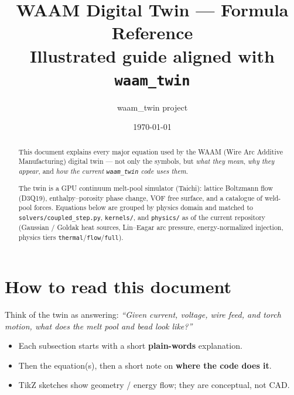 \documentclass[11pt,a4paper]{article}
\title{WAAM Digital Twin --- Formula Reference\\
\large Illustrated guide aligned with \texttt{waam\_twin}}
\author{waam\_twin project}
\date{\today}
\begin{document}
\maketitle

\begin{abstract}
This document explains every major equation used by the WAAM (Wire Arc Additive
Manufacturing) digital twin --- not only the symbols, but \emph{what they mean},
\emph{why they appear}, and \emph{how the current \texttt{waam\_twin} code uses them}.

The twin is a GPU continuum melt-pool simulator (Taichi): lattice Boltzmann flow
(D3Q19), enthalpy--porosity phase change, VOF free surface, and a catalogue of
weld-pool forces. Equations below are grouped by physics domain and matched to
\texttt{solvers/coupled\_step.py}, \texttt{kernels/}, and \texttt{physics/}
as of the current repository (Gaussian / Goldak heat sources, Lin--Eagar arc
pressure, energy-normalized injection, physics tiers \texttt{thermal}/\texttt{flow}/\texttt{full}).
\end{abstract}

\tableofcontents
\newpage

\section{How to read this document}

Think of the twin as answering: \emph{``Given current, voltage, wire feed, and
torch motion, what does the melt pool and bead look like?''}

\begin{center}
\end{center}

\begin{itemize}[leftmargin=*]
  \item Each subsection starts with a short \textbf{plain-words} explanation.
  \item Then the equation(s), then a short note on \textbf{where the code does it}.
  \item TikZ sketches show geometry / energy flow; they are conceptual, not CAD.
\end{itemize}
\end{document}
